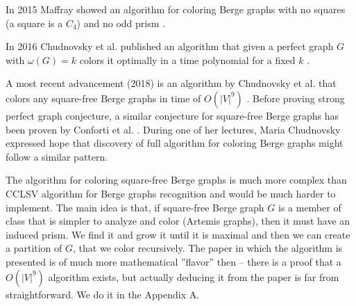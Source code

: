 In 2015 Maffray showed an algorithm for coloring Berge graphs with no squares (a square is a $C_4$) and no odd prism \cite{Maff2015}.

In 2016 Chudnovsky et al. published an algorithm that given a perfect graph $G$ with $\omega(G) = k$ colors it optimally in a time polynomial for a fixed $k$ \cite{Chudnovsky2017}.

A most recent advancement (2018) is an algorithm by Chudnovsky et al. that colors any square-free Berge graphs in time of $O(|V|^9)$ \cite{Chudnovsky2019}. Before proving strong perfect graph conjecture, a similar conjecture for square-free Berge graphs has been proven by Conforti et al. \cite{Conforti2004}. During one of her lectures, Maria Chudnovsky expressed hope that discovery of full algorithm for coloring Berge graphs might follow a similar pattern.

The algorithm for coloring square-free Berge graphs is much more complex than CCLSV algorithm for Berge graphs recognition and would be much harder to implement. The main idea is that, if square-free Berge graph $G$ is a member of class that is simpler to analyze and color (Artemis graphs), then it must have an induced prism. We find it and grow it until it is maximal and then we can create a partition of $G$, that we color recursively. The paper in which the algorithm is presented \cite{Chudnovsky2019} is of much more mathematical ''flavor'' then \cite{MC05} -- there is a proof that a $O(|V|^9)$ algorithm exists, but actually deducing it from the paper is far from straightforward. We do it in the Appendix A.